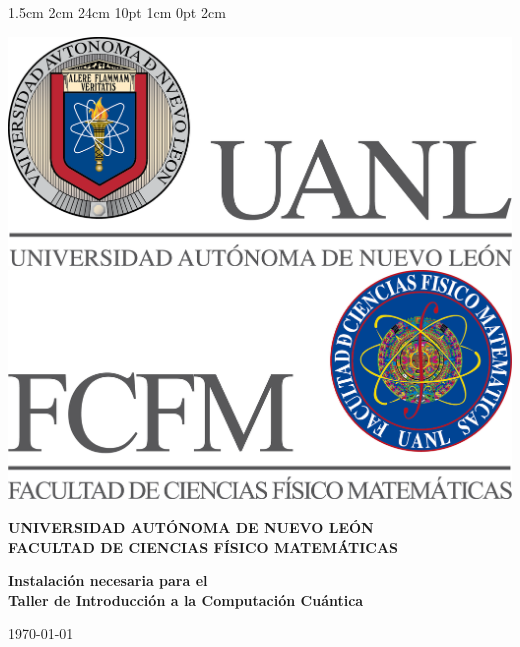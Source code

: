 \documentclass[12pt,letterpaper]{report}
\begin{document}
\setmargins{2.5cm}      
{1.5cm}                     
{2cm}  
{24cm}                    
{10pt}                          
{1cm}                          
{0pt}                             
{2cm} 
\begin{titlepage}
\begin{center}
\includegraphics[scale=0.40]{images/uanl.png} 
\hspace{2.5cm}
\includegraphics[scale=0.40]{images/fcfm.png}
\end{center}
\vspace{4cm}
\begin{center}
\textbf{
UNIVERSIDAD AUTÓNOMA DE NUEVO LEÓN\\
FACULTAD DE CIENCIAS FÍSICO MATEMÁTICAS\\}
\vspace*{2cm}
\begin{large}
\vspace{1cm}
\large{\textbf{Instalaci\'on necesaria para el \\Taller de Introducci\'on a la Computaci\'on Cu\'antica}}\\
\end{large}
\end{center}
\vspace{10cm}
\begin{flushright}
\today
\end{flushright}
\end{titlepage}
\end{document}
